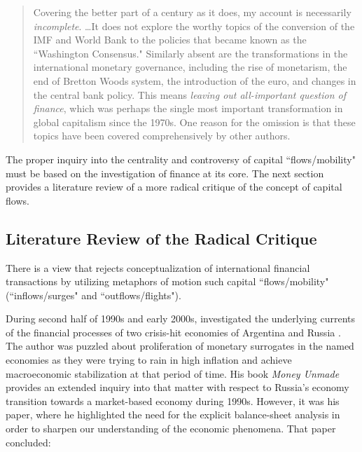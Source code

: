 \begin{quote}
Covering the better part of a century as it does, my account is necessarily \textit{incomplete}. \dots It does not explore the worthy topics of the conversion of the IMF and World Bank to the policies that became known as the ``Washington Consensus." Similarly absent are the transformations in the international monetary governance, including the rise of monetarism, the end of Bretton Woods system, the introduction of the euro, and changes in the central bank policy. This means \textit{leaving out all-important question of finance}, which was perhaps the single most important transformation in global capitalism since the 1970s. One reason for the omission is that these topics have been covered comprehensively by other authors. \citep[pp.~23-24, emphasis added]{slobodian2018}
\end{quote} 

The proper inquiry into the centrality and controversy of capital ``flows/mobility" must be based on the investigation of finance at its core. The next section provides a literature review of a more radical critique of the concept of capital flows. 

\subsection{Literature Review of the Radical Critique}\label{sec:rad_critique}

There is a view that rejects conceptualization of international financial transactions by utilizing metaphors of motion such capital ``flows/mobility" (``inflows/surges" and ``outflows/flights").

During second half of 1990s and early 2000s, \citeauthor{woodruff2005} investigated the underlying currents of the financial processes of two crisis-hit economies of Argentina and Russia \citep[see][]{woodruff2000,woodruff2005}. The author was puzzled about proliferation of monetary surrogates in the named economies as they were trying to rain in high inflation and achieve macroeconomic stabilization at that period of time. His book \textit{Money Unmade} \citeyear{woodruff2000} provides an extended inquiry into that matter with respect to Russia's economy transition towards a market-based economy during 1990s. However, it was his \citeyear{woodruff2005} paper, where he highlighted the need for the explicit balance-sheet analysis in order to sharpen our understanding of the economic phenomena. That paper concluded:

